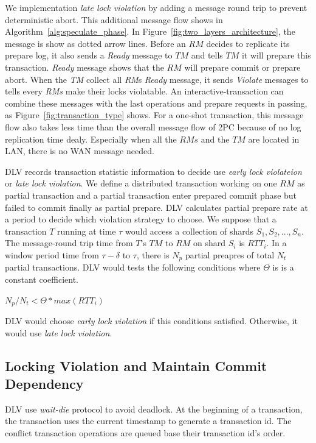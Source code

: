 \documentclass[conference]{IEEEtran}
\begin{document}
We implementation \emph{late lock violation} by adding a message round trip to prevent deterministic abort.
This additional message flow shows in Algorithm~\ref{alg:speculate_phase}.
In Figure~\ref{fig:two_layers_architecture}, the message is show as dotted arrow lines.
Before an ${RM}$ decides to replicate its prepare log, it also sends a \emph{Ready} message to ${TM}$ and tells ${TM}$ it will prepare this transaction.
\emph{Ready} message shows that the ${RM}$ will prepare commit or prepare abort.
When the \emph{TM} collect all \emph{RM}s \emph{Ready} message, it sends \emph{Violate} messages to tells every \emph{RMs} make their locks violatable.
An interactive-transaction can combine these messages with the last operations and prepare requests in passing, as Figure~\ref{fig:transaction_type} shows.
For a one-shot transaction, this message flow also takes less time than the overall message flow of 2PC because of no log replication time dealy.
Especially when all the ${RMs}$ and the ${TM}$ are located in LAN, there is no WAN message needed. 

DLV records transaction statistic information to decide use \emph{early lock violateion} or \emph{late lock violation}.
We define a distributed transaction working on one ${RM}$ as partial transaction and a partial transaction enter prepared commit phase but failed to commit finally as partial prepare.
DLV calculates partial prepare rate at a period to decide which violation strategy to choose.
We suppose that a transaction ${T}$ running at time ${\tau}$ would access a collection of shards
${S_1, S_2, ..., S_n}$. 
The message-round trip time from ${T}$'s ${TM}$ to ${RM}$ on shard ${S_i}$ is ${RTT_i}$.
In a window period time from ${\tau - \delta}$ to ${\tau}$, there is ${N_p}$ partial preapres of total ${N_t}$ partial transactions. 
DLV would tests the following conditions where ${\Theta}$ is is a constant coefficient. 

\begin{center}
  ${N_p / N_t < \Theta * max(RTT_i)}$
\end{center}

DLV would choose \emph{early lock violation} if this conditions satisfied. 
Otherwise, it would use \emph{late lock violation}.


\subsection {Locking Violation and Maintain Commit Dependency}
DLV use \emph{wait-die} protocol to avoid deadlock.
At the beginning of a transaction, the transaction uses the current timestamp to generate a transaction id.
The conflict transaction operations are queued base their transaction id's order. 
\end{document}

